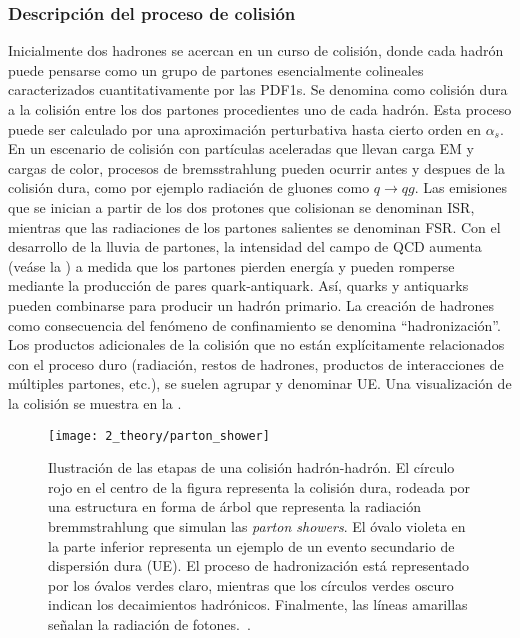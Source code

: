 \subsubsection{Descripción del proceso de colisión}

Inicialmente dos hadrones se acercan en un curso de colisión, donde cada hadrón puede pensarse como un grupo de partones esencialmente colineales caracterizados cuantitativamente por las \acp{PDF1}.
Se denomina como colisión dura a la colisión entre los dos partones procedientes uno de cada hadrón. Esta proceso puede ser calculado por una aproximación perturbativa hasta cierto orden en \(\alpha_s\).%
En un escenario de colisión con partículas aceleradas que llevan carga \ac{EM} y cargas de color, procesos de bremsstrahlung pueden ocurrir antes y despues de la colisión dura, como por ejemplo radiación de gluones como \(q \to qg\).
Las emisiones que se inician a partir de los dos protones que colisionan se denominan \ac{ISR}, mientras que las radiaciones de los partones salientes se denominan \ac{FSR}. Con el desarrollo de la lluvia de partones, la intensidad del campo de \ac{QCD} aumenta (veáse la \Fig{\ref{fig:theory:sm:mathematical:qcd:alphas}}) a medida que los partones pierden energía y pueden romperse mediante la producción de pares quark-antiquark. Así, quarks y antiquarks pueden combinarse para producir un hadrón primario. La creación de hadrones como consecuencia del fenómeno de confinamiento se denomina \enquote{hadronización}. Los productos adicionales de la colisión que no están explícitamente relacionados con el proceso duro (radiación, restos de hadrones, productos de interacciones de múltiples partones, etc.), se suelen agrupar y denominar \ac{UE}. Una visualización de la colisión \pp se muestra en la \Fig{\ref{fig:theory:sm:hadron_interactions:parton_shower}}.



\begin{figure}[ht!]
    \centering
    \texttt{[image: 2\_theory/parton\_shower]}
    \caption{Ilustración de las etapas de una colisión hadrón-hadrón. El círculo rojo en el centro de la figura representa la colisión dura, rodeada por una estructura en forma de árbol que representa la radiación bremmstrahlung que simulan las \textit{parton showers}. El óvalo violeta en la parte inferior representa un ejemplo de un evento secundario de dispersión dura (\ac{UE}). El proceso de hadronización está representado por los óvalos verdes claro, mientras que los círculos verdes oscuro indican los decaimientos hadrónicos. Finalmente, las líneas amarillas señalan la radiación de fotones.~\cite{Hoche-2015}.}
    \label{fig:theory:sm:hadron_interactions:parton_shower}
\end{figure}



